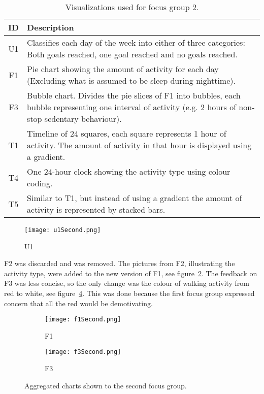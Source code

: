 \begin{table}[h!]
  \centering
  \begin{tabular}{|c|p{11cm}|}
    \hline
    \textbf{ID} & \textbf{Description} \\ \hline
    U1 & Classifies each day of the week into either of three categories: Both goals reached, one goal reached and no goals reached. \\ \hline
    F1 & Pie chart showing the amount of activity for each day (Excluding what is assumed to be sleep during nighttime). \\ \hline
    F3 & Bubble chart. Divides the pie slices of F1 into bubbles, each bubble representing one interval of activity (e.g. 2 hours of non-stop sedentary behaviour). \\ \hline
    T1 & Timeline of 24 squares, each square represents 1 hour of activity. The amount of activity in that hour is displayed using a gradient. \\ \hline
    T4 & One 24-hour clock showing the activity type using colour coding. \\ \hline
    T5 & Similar to T1, but instead of using a gradient the amount of activity is represented by stacked bars. \\ \hline
  \end{tabular}
  \caption{Visualizations used for focus group 2.}
  \label{tab:runProtDesc2}
\end{table}

\begin{figure}[h!]
  \centering
  \texttt{[image: u1Second.png]}
  \caption{U1}
  \label{fig:uSecond}
\end{figure}

F2 was discarded and was removed. The pictures from F2, illustrating the activity type, were added to the new version of F1, see figure~\ref{fig:f1Second}. The feedback on F3 was less concise, so the only change was the colour of walking activity from red to white, see figure~\ref{fig:f3Second}. This was done because the first focus group expressed concern that all the red would be demotivating.

\begin{figure}[h!]
  \centering
  \begin{subfigure}[b]{0.45\textwidth}
    \centering
    \texttt{[image: f1Second.png]}
    \caption{F1}
    \label{fig:f1Second}
  \end{subfigure}
  \begin{subfigure}[b]{0.45\textwidth}
    \centering
    \texttt{[image: f3Second.png]}
    \caption{F3}
    \label{fig:f3Second}
  \end{subfigure}
  \caption{Aggregated charts shown to the second focus group.}
\end{figure}

